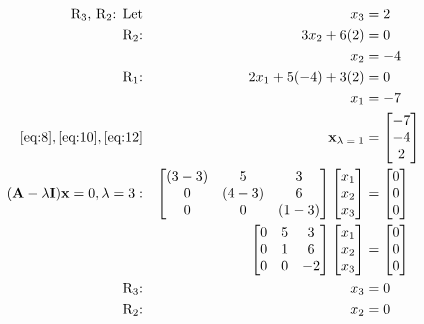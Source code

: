 \documentclass{article}
\begin{document}
\begin{align}
    \\
    \label{eq:8}
    \text{R\textsubscript{3}, R\textsubscript{2}: Let} && x_3 &= 2
    \\
    \label{eq:9} 
    \text{R\textsubscript{2}:} && 3x_2+6(2) &= 0
    \\
    \label{eq:10}
    && x_2 &= -4
    \\
    \label{eq:11} 
    \text{R\textsubscript{1}:} && 2x_1+5(-4) +3(2) &= 0
    \\
    \label{eq:12}
    && x_1 &= -7
    \\
    \label{eq:13}
    \eqref{eq:8}, \eqref{eq:10}, \eqref{eq:12} && \textbf{x\textsubscript{$\lambda=1$}} &= \begin{bmatrix} -7\\-4\\2\end{bmatrix}
    \\
    \label{eq:14}
    (\textbf{A}-\lambda\textbf{I})\textbf{x} = 0, \lambda=3: && \begin{bmatrix}
    (3-3) & 5 & 3\\
    0 & (4-3) & 6\\
    0 & 0 & (1-3) \end{bmatrix} \begin{bmatrix}x_1\\x_2\\x_3\end{bmatrix} &= \begin{bmatrix} 0\\0\\0 \end{bmatrix}
    \\
    \label{eq:15}
    &&\begin{bmatrix} 
    0 & 5 & 3\\
    0 & 1 & 6\\
    0 & 0 & -2 \end{bmatrix} \begin{bmatrix} x_1\\x_2\\x_3 \end{bmatrix} &= \begin{bmatrix} 0\\0\\0 \end{bmatrix}
    \\
    \label{eq:16}
    \text{R\textsubscript{3}:} && x_3 &= 0
    \\
    \label{eq:17} 
    \text{R\textsubscript{2}:} && x_2 &= 0

\end{align}
\end{document}
